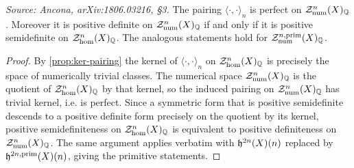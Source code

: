 \begin{corollary}
  \label{cor:semipos}
  \textit{Source: Ancona, arXiv:1806.03216, §3.}
  The pairing \(\langle \cdot, \cdot \rangle_{n}\) is perfect on
  \(\mathcal{Z}_{\mathrm{num}}^{n}(X)_{\mathbb{Q}}\). Moreover it is positive definite on
  \(\mathcal{Z}_{\mathrm{num}}^{n}(X)_{\mathbb{Q}}\) if and only if it is positive semidefinite
  on \(\mathcal{Z}_{\hom}^{n}(X)_{\mathbb{Q}}\). The analogous statements hold for
  \(\mathcal{Z}_{\mathrm{num}}^{n,\mathrm{prim}}(X)_{\mathbb{Q}}\).
\end{corollary}

\begin{proof}
  By \cref{prop:ker-pairing} the kernel of \(\langle \cdot, \cdot \rangle_{n}\)
  on \(\mathcal{Z}_{\hom}^{n}(X)_{\mathbb{Q}}\) is precisely the space of numerically
  trivial classes. The numerical space \(\mathcal{Z}_{\mathrm{num}}^{n}(X)_{\mathbb{Q}}\) is the
  quotient of \(\mathcal{Z}_{\hom}^{n}(X)_{\mathbb{Q}}\) by that kernel, so the induced
  pairing on \(\mathcal{Z}_{\mathrm{num}}^{n}(X)_{\mathbb{Q}}\) has trivial kernel, i.e. is
  perfect. Since a symmetric form that is positive semidefinite descends to a
  positive definite form precisely on the quotient by its kernel, positive
  semidefiniteness on \(\mathcal{Z}_{\hom}^{n}(X)_{\mathbb{Q}}\) is equivalent to
  positive definiteness on \(\mathcal{Z}_{\mathrm{num}}^{n}(X)_{\mathbb{Q}}\). The same argument
  applies verbatim with \(\mathfrak{h}^{2n}(X)(n)\) replaced by \(\mathfrak{h}^{2n,\mathrm{prim}}(X)(n)\),
  giving the primitive statements.
\end{proof}

